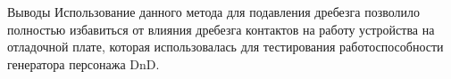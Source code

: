 \documentclass[12pt,a4paper,mathserif]{beamer}
\begin{document}
\begin{frame}{Выводы}
    \setlength{\parindent}{0.5cm}
    Использование данного метода для подавления дребезга позволило полностью избавиться от влияния дребезга контактов на работу устройства на отладочной плате, которая использовалась для тестирования работоспособности генератора персонажа DnD.
\end{frame}
\end{document}
